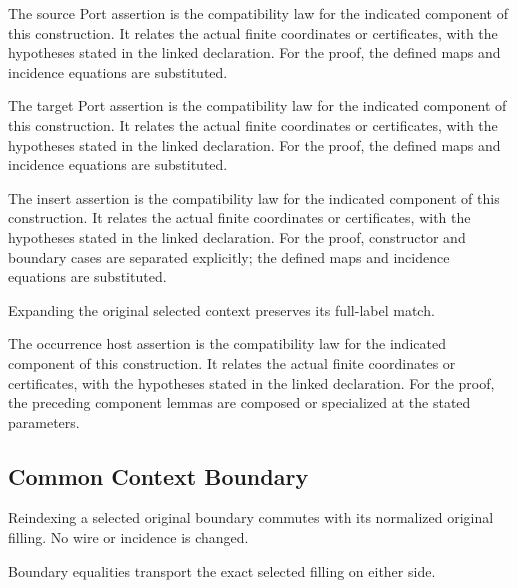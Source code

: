 The source Port assertion is the compatibility law for the indicated component of this construction. It relates the actual finite coordinates or certificates, with the hypotheses stated in the linked declaration.
For the proof, the defined maps and incidence equations are substituted.
\par{}

The target Port assertion is the compatibility law for the indicated component of this construction. It relates the actual finite coordinates or certificates, with the hypotheses stated in the linked declaration.
For the proof, the defined maps and incidence equations are substituted.
\par{}

The insert assertion is the compatibility law for the indicated component of this construction. It relates the actual finite coordinates or certificates, with the hypotheses stated in the linked declaration.
For the proof, constructor and boundary cases are separated explicitly; the defined maps and incidence equations are substituted.
\par{}

Expanding the original selected context preserves its full-label match.
\par{}

The occurrence host assertion is the compatibility law for the indicated component of this construction. It relates the actual finite coordinates or certificates, with the hypotheses stated in the linked declaration.
For the proof, the preceding component lemmas are composed or specialized at the stated parameters.
\par{}

\subsection{Common Context Boundary}
Reindexing a selected original boundary commutes with its normalized original filling. No wire or incidence is changed.

Boundary equalities transport the exact selected filling on either side.
\par{}

